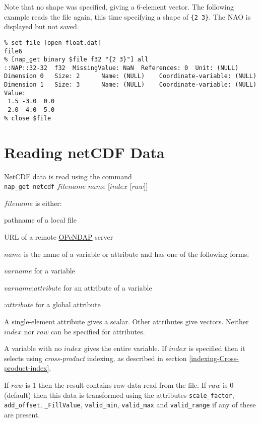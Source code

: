 Note that no shape was specified, giving a 6-element vector. The
following example reads the file again, this time specifying a shape of
  \texttt{\{2 3\}}. The NAO is displayed but not saved.
  \begin{verbatim}
% set file [open float.dat]
file6
% [nap_get binary $file f32 "{2 3}"] all
::NAP::32-32  f32  MissingValue: NaN  References: 0  Unit: (NULL)
Dimension 0   Size: 2      Name: (NULL)    Coordinate-variable: (NULL)
Dimension 1   Size: 3      Name: (NULL)    Coordinate-variable: (NULL)
Value:
 1.5 -3.0  0.0
 2.0  4.0  5.0
% close $file
\end{verbatim}

\section{Reading netCDF Data}
    \label{nap-get-Reading-netCDF-Data}

NetCDF data is read using the command
  \\
  \texttt{nap\_get netcdf} $\mathit{filename}$ $\mathit{name}$ [$\mathit{index}$ [$\mathit{raw}$]]

\noindent
  $\mathit{filename}$ is either:
\begin{bullets}
    \item pathname of a local file
    \item URL of a remote 
    \href{http://www.opendap.org/}{OPeNDAP}
    server
\end{bullets}

\noindent
$\mathit{name}$ is the name of a variable or attribute and has one of
the following forms:
\begin{bullets}
    \item $\mathit{varname}$ for a variable
    \item $\mathit{varname}\texttt{:}\mathit{attribute}$ for an attribute of a variable
    \item $\texttt{:}\mathit{attribute}$ for a global attribute
\end{bullets}

A single-element attribute gives a scalar. Other attributes give
  vectors. Neither 
  $\mathit{index}$ nor 
  $\mathit{raw}$ can be specified for attributes.

A variable with no 
  $\mathit{index}$ gives the entire variable.
If $\mathit{index}$ is specified then it selects using 
{\em cross-product} indexing, as described in section
  \ref{indexing-Cross-product-index}.

If 
  $\mathit{raw}$ is 1 then the result contains raw data read from the
  file. If 
  $\mathit{raw}$ is 0 (default) then this data is transformed using the
  attributes 
  \texttt{scale\_factor}, 
  \texttt{add\_offset}, 
  \texttt{\_FillValue}, 
  \texttt{valid\_min}, 
  \texttt{valid\_max} and 
  \texttt{valid\_range} if any of these are present.
  

